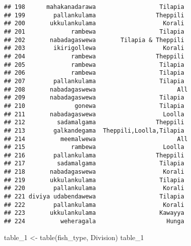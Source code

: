 \documentclass[
]{article}
\newenvironment{Shaded}{\begin{snugshade}}{\end{snugshade}}
\newcommand{\FunctionTok}[1]{\textcolor[rgb]{0.00,0.00,0.00}{#1}}
\newcommand{\NormalTok}[1]{#1}
\newcommand{\OtherTok}[1]{\textcolor[rgb]{0.56,0.35,0.01}{#1}}
\begin{document}
\begin{verbatim}
## 198      mahakanadarawa                  Tilapia 
## 199        pallankulama                 Theppili 
## 200       ukkulankulama                   Korali 
## 201             rambewa                  Tilapia 
## 202       nabadagaswewa       Tilapia & Theppili 
## 203        ikirigollewa                   Korali 
## 204             rambewa                 Theppili 
## 205             rambewa                  Tilapia 
## 206             rambewa                  Tilapia 
## 207        pallankulama                  Tilapia 
## 208       nabadagaswewa                       All
## 209       nabadagaswewa                  Tilapia 
## 210              gonewa                  Tilapia 
## 211       nabadagaswewa                   Loolla 
## 212         sadamalgama                 Theppili 
## 213        galkandegama  Theppili,Loolla,Tilapia 
## 214          meemalwewa                       All
## 215             rambewa                   Loolla 
## 216        pallankulama                 Theppili 
## 217         sadamalgama                  Tilapia 
## 218       nabadagaswewa                   Korali 
## 219       ukkulankulama                  Tilapia 
## 220        pallankulama                   Korali 
## 221 diviya udabendawewa                  Tilapia 
## 222        pallankulama                   Korali 
## 223       ukkulankulama                  Kawayya 
## 224          weheragala                    Hunga
\end{verbatim}

\begin{Shaded}
\begin{Highlighting}[]
\NormalTok{table\_1 }\OtherTok{\textless{}{-}} \FunctionTok{table}\NormalTok{(fish\_type, Division)}
\NormalTok{table\_1}
\end{Highlighting}
\end{Shaded}
\end{document}
